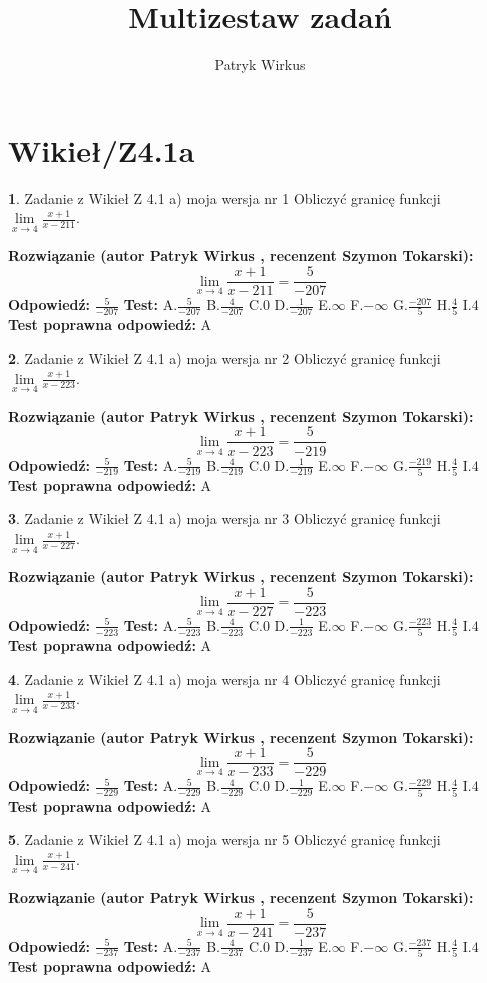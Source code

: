 \documentclass[12pt, a4paper]{article}
\title{Multizestaw zadań}
\author{Patryk Wirkus}
\date{}
\theoremstyle{definition} %
\newtheorem{zad}{}
\newcommand{\kategoria}[1]{\section{#1}}
\newcommand{\zadStart}[1]{\begin{zad}#1\newline}
\newcommand{\zadStop}{\end{zad}}
\newcommand{\rozwStart}[2]{\noindent \textbf{Rozwiązanie (autor #1 , recenzent #2): }\newline}
\newcommand{\rozwStop}{\newline}
\newcommand{\odpStart}{\noindent \textbf{Odpowiedź:}\newline}
\newcommand{\odpStop}{\newline}
\newcommand{\testStart}{\noindent \textbf{Test:}\newline}
\newcommand{\testStop}{\newline}
\newcommand{\kluczStart}{\noindent \textbf{Test poprawna odpowiedź:}\newline}
\newcommand{\kluczStop}{\newline}
\begin{document}
\maketitle

\kategoria{Wikieł/Z4.1a}


\zadStart{Zadanie z Wikieł Z 4.1 a) moja wersja nr 1}
Obliczyć granicę funkcji $\lim\limits_{x\to4}\frac{x+1}{x-211}$.
\zadStop
\rozwStart{Patryk Wirkus}{Szymon Tokarski}
$$\lim\limits_{x\to4}\frac{x+1}{x-211} = \frac{5}{-207}$$
\rozwStop
\odpStart
$\frac{5}{-207}$
\odpStop
\testStart
A.$\frac{5}{-207}$
B.$\frac{4}{-207}$
C.$0$
D.$\frac{1}{-207}$
E.$\infty$
F.$-\infty$
G.$\frac{-207}{5}$
H.$\frac{4}{5}$
I.$4$
\testStop
\kluczStart
A
\kluczStop



\zadStart{Zadanie z Wikieł Z 4.1 a) moja wersja nr 2}
Obliczyć granicę funkcji $\lim\limits_{x\to4}\frac{x+1}{x-223}$.
\zadStop
\rozwStart{Patryk Wirkus}{Szymon Tokarski}
$$\lim\limits_{x\to4}\frac{x+1}{x-223} = \frac{5}{-219}$$
\rozwStop
\odpStart
$\frac{5}{-219}$
\odpStop
\testStart
A.$\frac{5}{-219}$
B.$\frac{4}{-219}$
C.$0$
D.$\frac{1}{-219}$
E.$\infty$
F.$-\infty$
G.$\frac{-219}{5}$
H.$\frac{4}{5}$
I.$4$
\testStop
\kluczStart
A
\kluczStop



\zadStart{Zadanie z Wikieł Z 4.1 a) moja wersja nr 3}
Obliczyć granicę funkcji $\lim\limits_{x\to4}\frac{x+1}{x-227}$.
\zadStop
\rozwStart{Patryk Wirkus}{Szymon Tokarski}
$$\lim\limits_{x\to4}\frac{x+1}{x-227} = \frac{5}{-223}$$
\rozwStop
\odpStart
$\frac{5}{-223}$
\odpStop
\testStart
A.$\frac{5}{-223}$
B.$\frac{4}{-223}$
C.$0$
D.$\frac{1}{-223}$
E.$\infty$
F.$-\infty$
G.$\frac{-223}{5}$
H.$\frac{4}{5}$
I.$4$
\testStop
\kluczStart
A
\kluczStop



\zadStart{Zadanie z Wikieł Z 4.1 a) moja wersja nr 4}
Obliczyć granicę funkcji $\lim\limits_{x\to4}\frac{x+1}{x-233}$.
\zadStop
\rozwStart{Patryk Wirkus}{Szymon Tokarski}
$$\lim\limits_{x\to4}\frac{x+1}{x-233} = \frac{5}{-229}$$
\rozwStop
\odpStart
$\frac{5}{-229}$
\odpStop
\testStart
A.$\frac{5}{-229}$
B.$\frac{4}{-229}$
C.$0$
D.$\frac{1}{-229}$
E.$\infty$
F.$-\infty$
G.$\frac{-229}{5}$
H.$\frac{4}{5}$
I.$4$
\testStop
\kluczStart
A
\kluczStop



\zadStart{Zadanie z Wikieł Z 4.1 a) moja wersja nr 5}
Obliczyć granicę funkcji $\lim\limits_{x\to4}\frac{x+1}{x-241}$.
\zadStop
\rozwStart{Patryk Wirkus}{Szymon Tokarski}
$$\lim\limits_{x\to4}\frac{x+1}{x-241} = \frac{5}{-237}$$
\rozwStop
\odpStart
$\frac{5}{-237}$
\odpStop
\testStart
A.$\frac{5}{-237}$
B.$\frac{4}{-237}$
C.$0$
D.$\frac{1}{-237}$
E.$\infty$
F.$-\infty$
G.$\frac{-237}{5}$
H.$\frac{4}{5}$
I.$4$
\testStop
\kluczStart
A
\kluczStop
\end{document}
